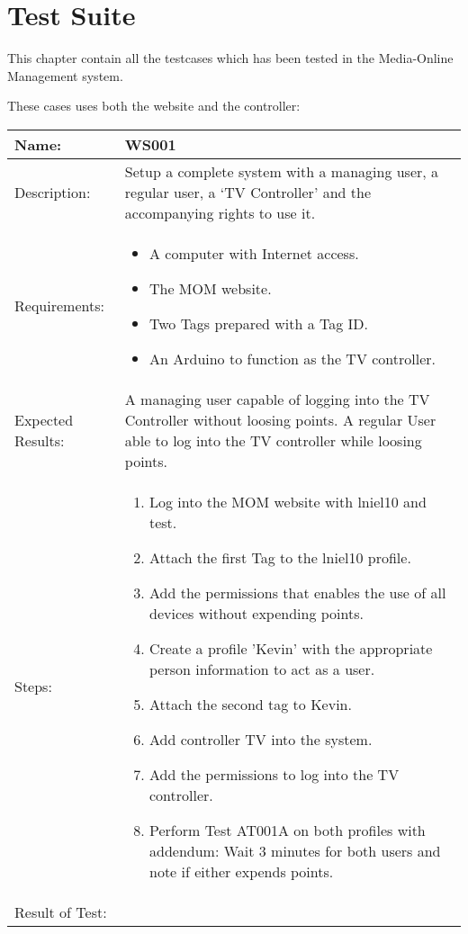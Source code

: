 \chapter{Test Suite}
\label{appen:testSuite}
This chapter contain all the testcases which has been tested in the Media-Online Management system.

These cases uses both the website and the controller:
\begin{table}[h]
	\centering
		\begin{tabular*}{\textwidth}{|l|l|}
		\hline
		\hline
		Name: & WS001\\
		\hline
		Description: & \parbox{0.70\textwidth}{Setup a complete system with a managing user, a regular user, a `TV Controller' and the accompanying rights to use it.}\\
		\hline
		Requirements: & \parbox{0.70\textwidth}{
		\begin{itemize}
			\item A computer with Internet access.
			\item The MOM website.
			\item Two Tags prepared with a Tag ID.
			\item An Arduino to function as the TV controller. 
		\end{itemize}}
		\\
		\hline
		Expected Results: & \parbox{.70\textwidth}{A managing user capable of logging into the TV Controller without loosing points. A regular User able to log into the TV controller while loosing points.}\\
		\hline
		Steps: & \parbox{.70\textwidth}{
		\begin{enumerate}
			\item Log into the MOM website with lniel10 and test.
			\item Attach the first Tag to the lniel10 profile.
			\item Add the permissions that enables the use of all devices without expending points.
			\item Create a profile 'Kevin' with the appropriate person information to act as a user.
			\item Attach the second tag to Kevin.
			\item Add controller TV into the system.
			\item Add the permissions to log into the TV controller.
			\item Perform Test AT001A on both profiles with addendum: Wait 3 minutes for both users and note if either expends points.
		\end{enumerate}}
		\\		
		\hline
		Result of Test: & \\
		\hline
		\end{tabular*}
\end{table}



